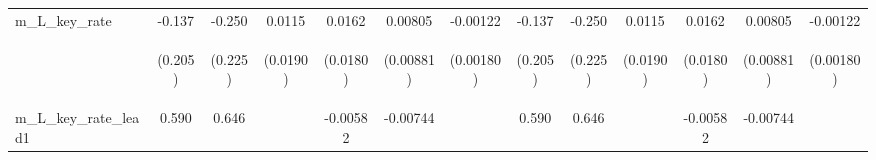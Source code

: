 \documentclass[]{article}
\begin{document}
\begin{center}
\begin{tabular}{lcccccccccccc}
m\_L\_key\_rate & -0.137 & -0.250 & 0.0115 & 0.0162 & 0.00805 & -0.00122 & -0.137 & -0.250 & 0.0115 & 0.0162 & 0.00805 & -0.00122 \\
\vspace{4pt} & \begin{footnotesize}(0.205)\end{footnotesize} & \begin{footnotesize}(0.225)\end{footnotesize} & \begin{footnotesize}(0.0190)\end{footnotesize} & \begin{footnotesize}(0.0180)\end{footnotesize} & \begin{footnotesize}(0.00881)\end{footnotesize} & \begin{footnotesize}(0.00180)\end{footnotesize} & \begin{footnotesize}(0.205)\end{footnotesize} & \begin{footnotesize}(0.225)\end{footnotesize} & \begin{footnotesize}(0.0190)\end{footnotesize} & \begin{footnotesize}(0.0180)\end{footnotesize} & \begin{footnotesize}(0.00881)\end{footnotesize} & \begin{footnotesize}(0.00180)\end{footnotesize} \\
m\_L\_key\_rate\_lead1 & 0.590 & 0.646 &  & -0.00582 & -0.00744 &  & 0.590 & 0.646 &  & -0.00582 & -0.00744 &  \\

\end{tabular}
\end{center}
\end{document}
